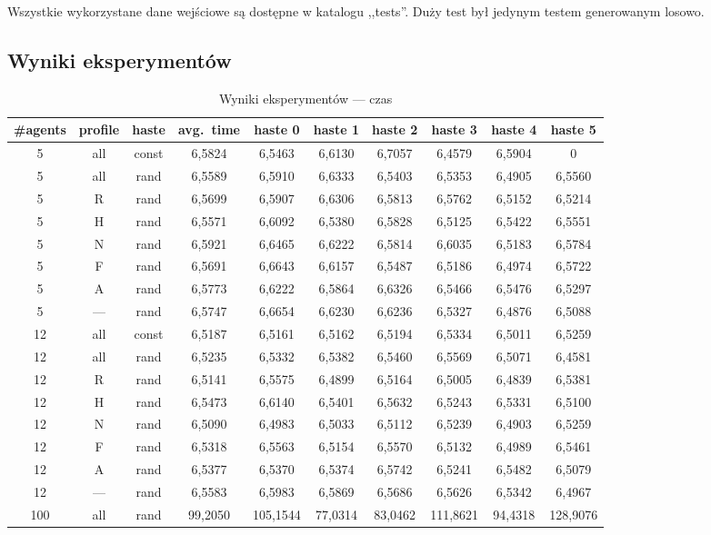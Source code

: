 \documentclass[11pt]{article}
\begin{document}
Wszystkie wykorzystane dane wejściowe są dostępne w katalogu ,,tests''. Duży test był jedynym testem generowanym losowo.

\subsection{Wyniki eksperymentów}
\begin{table}[h!]
  \begin{center}
    \begin{tabular}{|c|c|c||c|c|c|c|c|c|c|}
      \hline
      \#agents & profile & haste & avg.\ time & haste 0 & haste 1 & haste 2 & haste 3 & haste 4 & haste 5 \\
      \hline
      5 & all & const & 6,5824 & 6,5463 & 6,6130 & 6,7057 & 6,4579 & 6,5904 & 0\\
      \hline
      5 & all & rand &  6,5589 & 6,5910 & 6,6333 & 6,5403 & 6,5353 & 6,4905 & 6,5560  \\
      \hline
      5 & R & rand &  6,5699 & 6,5907 & 6,6306 & 6,5813 & 6,5762 & 6,5152 & 6,5214 \\
      \hline
      5 & H & rand &  6,5571 & 6,6092 & 6,5380 & 6,5828 & 6,5125 & 6,5422 & 6,5551 \\
      \hline
      5 & N & rand &  6,5921 & 6,6465 & 6,6222 & 6,5814 & 6,6035 & 6,5183 & 6,5784  \\
      \hline
      5 & F & rand &  6,5691 & 6,6643 & 6,6157 & 6,5487 & 6,5186 & 6,4974 & 6,5722 \\
      \hline
      5 & A & rand &  6,5773 & 6,6222 & 6,5864 & 6,6326 & 6,5466 & 6,5476 & 6,5297 \\
      \hline
      5 & --- & rand &  6,5747 & 6,6654 & 6,6230 & 6,6236 & 6,5327 & 6,4876 & 6,5088  \\
      \hline
      12 & all & const & 6,5187 & 6,5161 & 6,5162 & 6,5194 & 6,5334 & 6,5011 & 6,5259 \\
      \hline
      12 & all & rand & 6,5235 & 6,5332 & 6,5382 & 6,5460 & 6,5569 & 6,5071 & 6,4581  \\
      \hline
      12 & R & rand & 6,5141 & 6,5575 & 6,4899 & 6,5164 & 6,5005 & 6,4839 & 6,5381 \\
      \hline
      12 & H & rand & 6,5473 & 6,6140 & 6,5401 & 6,5632 & 6,5243 & 6,5331 & 6,5100 \\
      \hline
      12 & N & rand & 6,5090 & 6,4983 & 6,5033 & 6,5112 & 6,5239 & 6,4903 & 6,5259 \\
      \hline
      12 & F & rand & 6,5318 & 6,5563 & 6,5154 & 6,5570 & 6,5132 & 6,4989 & 6,5461 \\
      \hline
      12 & A & rand & 6,5377 & 6,5370 & 6,5374 & 6,5742 & 6,5241 & 6,5482 & 6,5079 \\
      \hline
      12 & --- & rand & 6,5583 & 6,5983 & 6,5869 & 6,5686 & 6,5626 & 6,5342 & 6,4967  \\
      \hline
      100 & all & rand & 99,2050 & 105,1544 & 77,0314 & 83,0462 & 111,8621 & 94,4318 & 128,9076 \\
      \hline
    \end{tabular}
    \caption{Wyniki eksperymentów --- czas}\label{tbl}
  \end{center}
\end{table}
\end{document}
